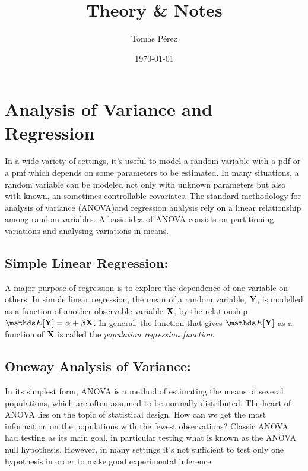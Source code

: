 \documentclass{homework}
\author{Tomás Pérez}
\date{\today}
\title{Theory \& Notes}
\begin{document}
 \maketitle

\section{Analysis of Variance and Regression}

In a wide variety of settings, it's useful to model a random variable with a pdf or a pmf which depends on some parameters to be estimated. In many situations, a random variable can be modeled not only with unknown parameters but also with known, an sometimes controllable covariates. The standard methodology for analysis of variance (ANOVA)and regression analysis rely on a linear relationship among random variables. A basic idea of ANOVA consists on partitioning variations and analysing variations in means. \\

\subsection{\textbf{Simple Linear Regression:}}

A major purpose of regression is to explore the dependence of one variable on others. In simple linear regression, the mean of a random variable, ${\bf Y}$, is modelled as a function of another observable variable ${\bf X}$, by the relationship $\E[\Y] = \alpha + \beta \X$. In general, the function that gives $\E[\Y]$ as a function of ${\bf X}$ is called the \textit{population regression function}. \\

\subsection{\textbf{Oneway Analysis of Variance:}}

In its simplest form, ANOVA is a method of estimating the means of several populations, which are often assumed to be normally distributed. The heart of ANOVA lies on the topic of statistical design. How can we get the most information on the populations with the fewest observations? Classic ANOVA had testing as its main goal, in particular testing what is known as the ANOVA null hypothesis. However, in many settings it's not sufficient to test only one hypothesis in order to make good experimental inference. \\
\end{document}
